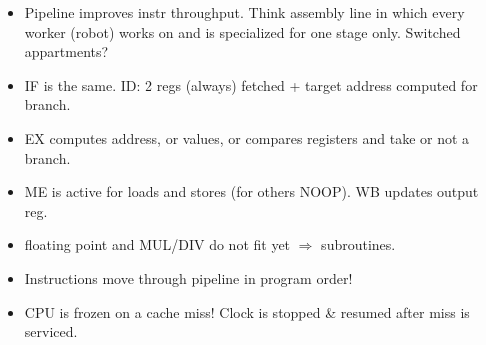 \documentclass{beamer}
\newcommand{\emp}[1]{\textcolor{DikuRed}{ #1}}
\begin{document}
\begin{frame}[fragile,t]
\begin{scriptsize}
\begin{itemize}
\item Pipeline improves instr throughput. Think assembly line in 
        which every worker (robot) works on and is specialized for one 
        stage only. Switched appartments?\bigskip
\item \emp{IF} is the same. \emp{ID}: 2 regs (always) fetched + target address computed for branch.
\item \emp{EX} computes address, or values, or compares registers and take or not a branch.
\item \emp{ME} is active for loads and stores (for others NOOP). \emp{WB} updates output reg.
\item floating point and  MUL/DIV do not fit yet $\Rightarrow$ subroutines.\bigskip
\item \emp{Instructions move through pipeline in program order!}
\item \emp{CPU is frozen on a cache miss!} Clock is stopped \& resumed after miss is serviced.

\end{itemize}
\end{scriptsize}

\end{frame}
\end{document}
